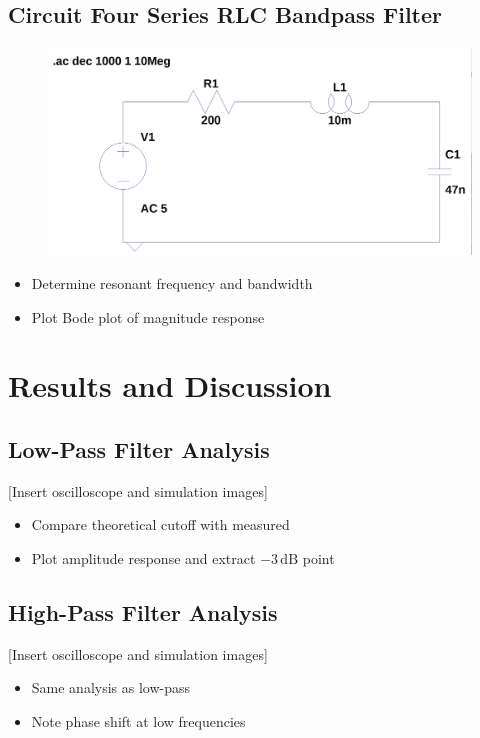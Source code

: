\documentclass[12pt]{article}
\begin{document}
\subsection{Circuit Four Series RLC Bandpass Filter}

\begin{figure}[H]
	\includegraphics[width=\textwidth]{e6_04}
\end{figure}
\begin{itemize}
	\item Determine resonant frequency and bandwidth
	\item Plot Bode plot of magnitude response
\end{itemize}

\section{Results and Discussion}
\subsection{Low-Pass Filter Analysis}
[Insert oscilloscope and simulation images]
\begin{itemize}
	\item Compare theoretical cutoff with measured
	\item Plot amplitude response and extract $-3\,\mathrm{dB}$ point
\end{itemize}

\subsection{High-Pass Filter Analysis}
[Insert oscilloscope and simulation images]
\begin{itemize}
	\item Same analysis as low-pass
	\item Note phase shift at low frequencies
\end{itemize}
\end{document}
